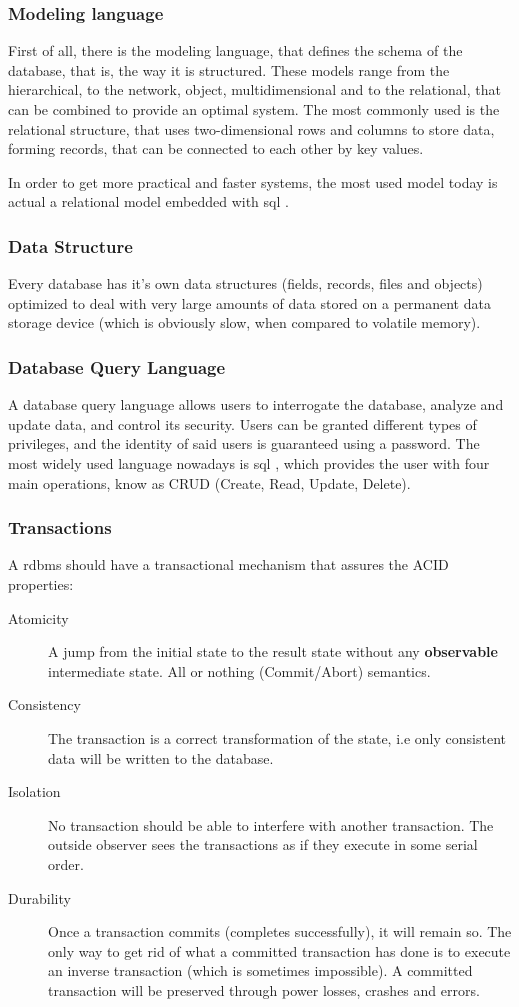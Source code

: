\subsubsection{Modeling language}
First of all, there is the modeling language, that defines the schema of the database, that is, the way it is structured. These models range from the hierarchical, to the network, object, multidimensional and to the relational, that can be combined to provide an optimal system. The most commonly used is the relational structure, that uses two-dimensional rows and columns to store data, forming records, that can be connected to each other by key values. 

In order to get more practical and faster systems, the most used model today is actual a relational model embedded with \ac{sql} .

\subsubsection{Data Structure}
Every database has it's own data structures (fields, records, files and objects) optimized to deal with very large amounts of data stored on a permanent data storage device (which is obviously slow, when compared to volatile memory).

\subsubsection{Database Query Language}
A database query language allows users to interrogate the database, analyze and update data, and control its security. Users can be granted different types of privileges, and the identity of said users is guaranteed using a password. The most widely used language nowadays is \ac{sql} , which provides the user with four main operations, know as CRUD (Create, Read, Update, Delete).  

\subsubsection{Transactions}
A \ac{rdbms} should have a transactional mechanism that assures the ACID properties:
\begin{description}
	\item[Atomicity] A jump from the initial state to the result state without any \textbf{observable} intermediate state. All or nothing (Commit/Abort) semantics. 
	\item[Consistency] The transaction is a correct transformation of the state, i.e only consistent data will be written to the database.
	\item[Isolation] No transaction should be able to interfere with another transaction. The outside observer sees the transactions as if they execute in some serial order.
	\item[Durability] Once a transaction commits (completes successfully), it will remain so. The only way to get rid of what a committed transaction has done is to execute an inverse transaction (which is sometimes impossible). A committed transaction will be preserved through power losses, crashes and errors. 
\end{description}

